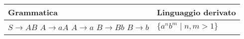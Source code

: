\documentclass{standalone}
\begin{document}
\begin{tabularx}{\textwidth}{XX}
		Grammatica & Linguaggio derivato\\
    \midrule
        \(S \to AB\) \newline
        \(A \to aA\) \newline
        \(A \to a\) \newline
        \(B \to Bb\) \newline
        \(B \to b\)
        &
        \(\{a^n b^m \mid n,m > 1\}\)
\end{tabularx}
\end{document}
